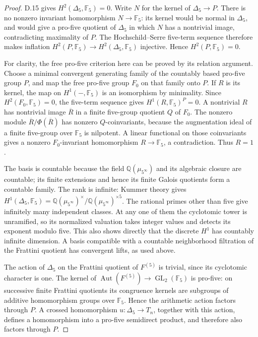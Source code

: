 \begin{proof}
D.15 gives \(H^2(\Delta_5,\mathbb F_5)=0\).
Write \(N\) for the kernel of \(\Delta_5\to P\).
There is no nonzero invariant homomorphism
\(N\to\mathbb F_5\): its kernel would be normal
in \(\Delta_5\), and would give a pro-five
quotient of \(\Delta_5\) in which \(N\) has a
nontrivial image, contradicting maximality of
\(P\). The Hochschild--Serre five-term sequence
therefore makes inflation
\(H^2(P,\mathbb F_5)\to H^2(\Delta_5,\mathbb F_5)\)
injective. Hence \(H^2(P,\mathbb F_5)=0\).

For clarity, the free pro-five criterion here can
be proved by its relation argument. Choose a
minimal convergent generating family of the
countably based pro-five group \(P\), and map
the free pro-five group \(F_0\) on that family
onto \(P\). If \(R\) is its kernel, the map on
\(H^1(-,\mathbb F_5)\) is an isomorphism by
minimality. Since \(H^2(F_0,\mathbb F_5)=0\),
the five-term sequence gives
\(H^1(R,\mathbb F_5)^P=0\). A nontrivial \(R\)
has nontrivial image \(\overline R\) in a finite
five-group quotient \(Q\) of \(F_0\). The
nonzero module \(\overline R/\Phi(\overline R)\)
has nonzero \(Q\)-coinvariants, because the
augmentation ideal of a finite five-group over
\(\mathbb F_5\) is nilpotent. A linear functional
on those coinvariants gives a nonzero
\(F_0\)-invariant homomorphism \(R\to\mathbb F_5\),
a contradiction. Thus \(R=1\).

The basis is countable because the field
\(\mathbb Q(\mu_{5^\infty})\) and its algebraic
closure are countable; its finite extensions
and hence its finite Galois quotients form a
countable family. The rank is infinite:
Kummer theory gives
\(H^1(\Delta_5,\mathbb F_5)
 =\mathbb Q(\mu_{5^\infty})^\times/
   \mathbb Q(\mu_{5^\infty})^{\times5}\).
The rational primes other than five give
infinitely many independent classes. At any
one of them the cyclotomic tower is unramified,
so its normalized valuation takes integer
values and detects its exponent modulo five.
This also shows directly that the discrete
\(H^1\) has countably infinite dimension.
A basis compatible with a countable
neighborhood filtration of the Frattini
quotient has convergent lifts, as used above.

The action of \(\Delta_5\) on the Frattini
quotient of \(F^{(5)}\) is trivial, since its
cyclotomic character is one. The kernel of
\(\operatorname{Aut}(F^{(5)})\to\operatorname{GL}_2(\mathbb F_5)\)
is pro-five: on successive finite Frattini
quotients its congruence kernels are subgroups
of additive homomorphism groups over
\(\mathbb F_5\). Hence the arithmetic action
factors through \(P\). A crossed homomorphism
\(u:\Delta_5\to T_n\), together with this
action, defines a homomorphism into a pro-five
semidirect product, and therefore also factors
through \(P\).


\end{proof}

